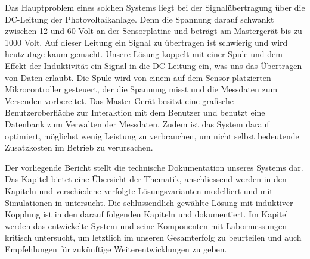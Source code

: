 Das  Hauptproblem  eines solchen  Systems  liegt  bei der  Signal\"ubertragung
\"uber  die  DC-Leitung  der   Photovoltaikanlage. Denn  die  Spannung  darauf
schwankt  zwischen 12  und  60  Volt an  der  Sensorplatine  und betr\"agt  am
Masterger\"at bis zu 1000 Volt. Auf  dieser Leitung ein Signal zu \"ubertragen
ist schwierig  und wird heutzutage  kaum gemacht. Unsere L\"osung  koppelt mit
einer Spule  und dem Effekt  der Induktivit\"at  ein Signal in  die DC-Leitung
ein, was uns das \"Ubertragen von  Daten erlaubt. Die Spule wird von einem auf
dem  Sensor  platzierten Mikrocontroller  gesteuert,  der  die Spannung  misst
und  die  Messdaten  zum  Versenden  vorbereitet. Das  Master-Ger\"at  besitzt
eine  grafische  Benutzeroberfl\"ache zur  Interaktion  mit  dem Benutzer  und
benutzt  eine Datenbank  zum Verwalten  der Messdaten.   Zudem ist  das System
darauf optimiert, m\"oglichst  wenig Leistung zu verbrauchen,  um nicht selbst
bedeutende Zusatzkosten im Betrieb zu verursachen.

Der   vorliegende  Bericht   stellt  die   technische  Dokumentation   unseres
Systems     dar. Das    Kapitel     \emph{}    bietet
eine    \"Ubersicht    der    Thematik,   anschliessend    werden    in    den
Kapiteln    \emph{}   und    \emph{}
verschiedene     verfolgte    L\"osungsvarianten     modelliert    und     mit
Simulationen  in     untersucht. Die  schlussendlich  gew\"ahlte
L\"osung   mit    induktiver   Kopplung   ist   in    den   darauf   folgenden
Kapiteln  \emph{} und  \emph{}
dokumentiert.   Im   Kapitel  \emph{}   werden  das
entwickelte  System   und  seine   Komponenten  mit   Labormessungen  kritisch
untersucht, um letztlich  im \emph{} unseren Gesamterfolg
zu beurteilen und auch  Empfehlungen f\"ur zuk\"unftige Weiterentwicklungen zu
geben.
